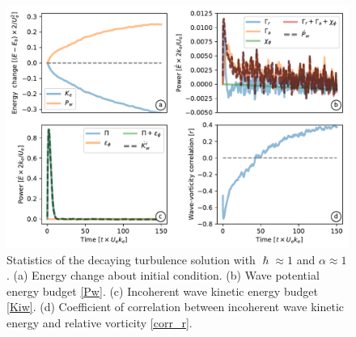 \documentclass{jfm}
\begin{document}
 \begin{figure}
 \label{stats_turb}
 \centering
 \includegraphics[width=1.\textwidth]{figs/fig4.pdf}
 \caption{Statistics of the decaying turbulence solution with $\hslash \approx 1$
         and $\alpha \approx 1$. (a) Energy change about initial condition.
         (b) Wave potential energy budget \eqref{Pw}. (c) Incoherent wave kinetic
         energy budget \eqref{Kiw}. (d) Coefficient of correlation between
         incoherent wave
         kinetic energy and relative vorticity \eqref{corr_r}.
         }
 \end{figure}
\end{document}
